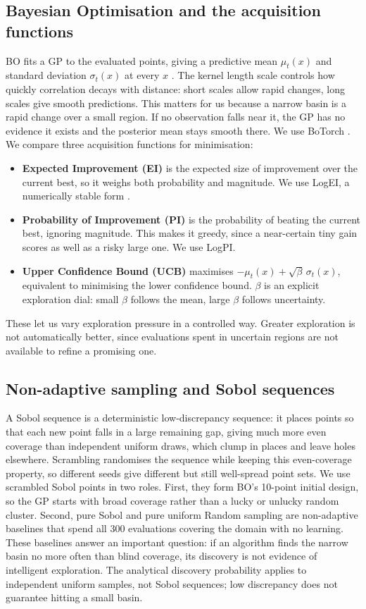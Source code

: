 \documentclass[11pt,a4paper]{article}
\begin{document}
\subsection{Bayesian Optimisation and the acquisition functions}
BO fits a GP to the evaluated points, giving a predictive mean $\mu_t(x)$ and standard deviation $\sigma_t(x)$ at every $x$ \cite{rasmussen}. The kernel length scale controls how quickly correlation decays with distance: short scales allow rapid changes, long scales give smooth predictions. This matters for us because a narrow basin is a rapid change over a small region. If no observation falls near it, the GP has no evidence it exists and the posterior mean stays smooth there. We use BoTorch \cite{botorch}. We compare three acquisition functions for minimisation:
\begin{itemize}
  \item \textbf{Expected Improvement (EI)} \cite{jones} is the expected size of improvement over the current best, so it weighs both probability and magnitude. We use LogEI, a numerically stable form \cite{ament}.
  \item \textbf{Probability of Improvement (PI)} \cite{kushner} is the probability of beating the current best, ignoring magnitude. This makes it greedy, since a near-certain tiny gain scores as well as a risky large one. We use LogPI.
  \item \textbf{Upper Confidence Bound (UCB)} \cite{srinivas} maximises $-\mu_t(x)+\sqrt{\beta}\,\sigma_t(x)$, equivalent to minimising the lower confidence bound. $\beta$ is an explicit exploration dial: small $\beta$ follows the mean, large $\beta$ follows uncertainty.
\end{itemize}
These let us vary exploration pressure in a controlled way. Greater exploration is not automatically better, since evaluations spent in uncertain regions are not available to refine a promising one.

\subsection{Non-adaptive sampling and Sobol sequences}
A Sobol sequence \cite{sobol} is a deterministic low-discrepancy sequence: it places points so that each new point falls in a large remaining gap, giving much more even coverage than independent uniform draws, which clump in places and leave holes elsewhere. Scrambling \cite{owen} randomises the sequence while keeping this even-coverage property, so different seeds give different but still well-spread point sets. We use scrambled Sobol points in two roles. First, they form BO's 10-point initial design, so the GP starts with broad coverage rather than a lucky or unlucky random cluster. Second, pure Sobol and pure uniform Random sampling are non-adaptive baselines that spend all 300 evaluations covering the domain with no learning. These baselines answer an important question: if an algorithm finds the narrow basin no more often than blind coverage, its discovery is not evidence of intelligent exploration. The analytical discovery probability applies to independent uniform samples, not Sobol sequences; low discrepancy does not guarantee hitting a small basin.
\end{document}
